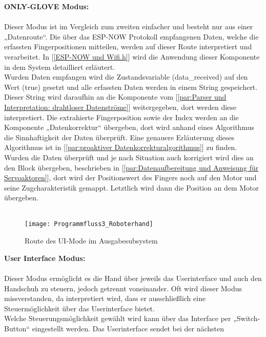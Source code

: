 \documentclass[titlepage,12pt,twoside]{article}
\begin{document}
\hfill \break
\textbf{ONLY-GLOVE Modus:} \\
\\
Dieser Modus ist im Vergleich zum zweiten einfacher und besteht nur aus einer „Datenroute“. Die über das ESP-NOW Protokoll empfangenen Daten, welche 
die erfassten Fingerpositionen mitteilen, werden auf dieser Route interpretiert und verarbeitet. In [\textcolor{blue}{\autoref{ESP-NOW und Wifi.h}}] wird 
die Anwendung dieser Komponente in dem System detailliert erläutert. \\
Wurden Daten empfangen wird die Zustandsvariable (data\_received) auf den Wert (true) gesetzt und alle erfassten Daten werden in einem String gespeichert. 
Dieser String wird daraufhin an die Komponente  vom [\textcolor{blue}{\autoref{par:Parser und Interpretation: drahtloser Datenströme}}] weitergegeben, 
dort werden diese interpretiert. Die extrahierte Fingerposition sowie der Index werden an die Komponente „Datenkorrektur“ übergeben, dort wird anhand 
eines Algorithmus die Sinnhaftigkeit der Daten überprüft. Eine genauere Erläuterung dieses Algorithmus ist in [\textcolor{blue}{\autoref{par:proaktiver Datenkorrekturalgorithmus}}]
zu finden. \\
Wurden die Daten überprüft und je nach Situation auch korrigiert wird dies an den Block  übergeben, beschrieben in 
[\textcolor{blue}{\autoref{par:Datenaufbereitung und Anweisung für Servoaktoren}}], dort wird der Positionswert des Fingers noch auf den Motor und seine Zugcharakteristik 
gemappt. Letztlich wird dann die Position an dem Motor übergeben. \\
\\
\begin{figure}[H]
	\begin{center}
		\scalebox{0.9}
		{\texttt{[image: Programmfluss3\_Roboterhand]}}
		\caption{Route des UI-Mode im Ausgabesubsystem}
		\label{fig:Programmfluss3_Roboterhand}		
	\end{center}
\end{figure}
\hfill \break
\textbf{User Interface Modus:} \\
\\
Dieser Modus ermöglicht es die Hand über jeweils das Userinterface und auch den Handschuh zu steuern, jedoch getrennt voneinander. Oft wird dieser Modus 
missverstanden, da interpretiert wird, dass er ausschließlich eine Steuermöglichkeit über das Userinterface bietet. \\
Welche Steuerungsmöglichkeit gewählt wird kann über das Interface per „Switch-Button“ eingestellt werden. Das Userinterface sendet bei der nächsten 
\end{document}
